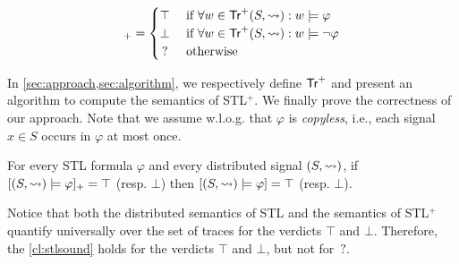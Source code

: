\small
\begin{equation*}
	[(S,{\hb}) \models \varphi]_+ = 
	\begin{cases}
		\top & \text{ if } \forall w \in \tr^+(S,{\hb}) : w \models \varphi \\
		\bot & \text{ if } \forall w \in \tr^+(S,{\hb}) : w \models \lnot\varphi \\
		\,? & \text{ otherwise}
	\end{cases}
\end{equation*}
\normalsize

In \cref{sec:approach,sec:algorithm}, we respectively define $\mathsf{Tr}^+$ and present an algorithm to compute the semantics of STL$^+$.
We finally prove the correctness of our approach.
Note that we assume w.l.o.g. that $\varphi$ is \emph{copyless}, i.e., each signal $x \in S$ occurs in $\varphi$ at most once.

\begin{theorem} \label{cl:stlsound}
	For every STL formula $\varphi$ and every distributed signal $(S,{\rightsquigarrow})$, if $[(S,{\rightsquigarrow}) \models \varphi]_+ = \top$ (resp. $\bot$) then $[(S,{\rightsquigarrow}) \models \varphi] = \top$ (resp. $\bot$).
\end{theorem}

Notice that both the distributed semantics of STL and the semantics of STL$^+$ quantify universally over the set of traces for the verdicts $\top$ and $\bot$.
Therefore, the \cref{cl:stlsound} holds for the verdicts $\top$ and $\bot$, but not for ${\,?}$.

